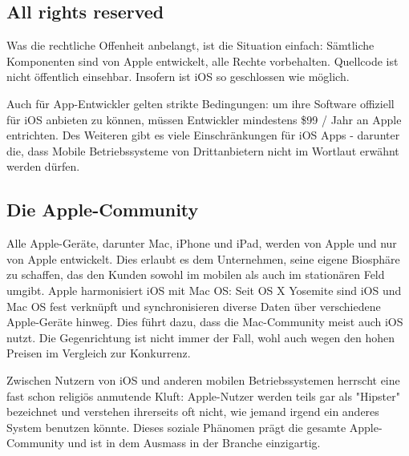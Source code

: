 \subsection{All rights reserved}
Was die rechtliche Offenheit anbelangt, ist die Situation einfach: Sämtliche Komponenten sind von Apple entwickelt, alle Rechte vorbehalten. Quellcode ist nicht öffentlich einsehbar. Insofern ist iOS so geschlossen wie möglich.

Auch für App-Entwickler gelten strikte Bedingungen: um ihre Software offiziell für iOS anbieten zu können, müssen Entwickler mindestens \$99 / Jahr an Apple entrichten. Des Weiteren gibt es viele Einschränkungen für iOS Apps - darunter die, dass Mobile Betriebssysteme von Drittanbietern nicht im Wortlaut erwähnt werden dürfen.\\

\subsection{Die Apple-Community}
Alle Apple-Geräte, darunter Mac, iPhone und iPad, werden von Apple und nur von Apple entwickelt. Dies erlaubt es dem Unternehmen, seine eigene Biosphäre zu schaffen, das den Kunden sowohl im mobilen als auch im stationären Feld umgibt. Apple harmonisiert iOS mit Mac OS: Seit OS X Yosemite sind iOS und Mac OS fest verknüpft und synchronisieren diverse Daten über verschiedene Apple-Geräte hinweg. Dies führt dazu, dass die Mac-Community meist auch iOS nutzt. Die Gegenrichtung ist nicht immer der Fall, wohl auch wegen den hohen Preisen im Vergleich zur Konkurrenz.

Zwischen Nutzern von iOS und anderen mobilen Betriebssystemen herrscht eine fast schon religiös anmutende Kluft: Apple-Nutzer werden teils gar als "Hipster" bezeichnet und verstehen ihrerseits oft nicht, wie jemand irgend ein anderes System benutzen könnte. Dieses soziale Phänomen prägt die gesamte Apple-Community und ist in dem Ausmass in der Branche einzigartig.